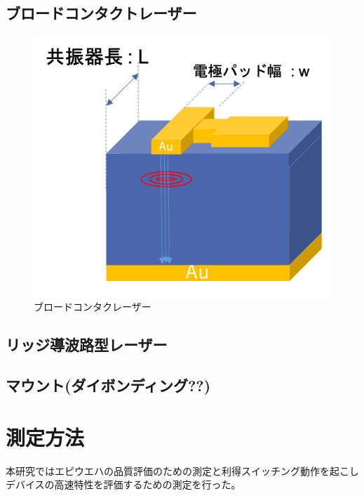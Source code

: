 \subsection{ブロードコンタクトレーザー}
\begin{figure}[htbp]
	\includegraphics[width=15cm]{figure/fig_broadcontact.png}
	\caption{ブロードコンタクレーザー}
	\label{fig:sample_broadcontact}
\end{figure}
\subsection{リッジ導波路型レーザー}
\subsection{マウント(ダイボンディング??)}
\section{測定方法}
本研究ではエピウエハの品質評価のための測定と利得スイッチング動作を起こしデバイスの高速特性を評価するための測定を行った。
